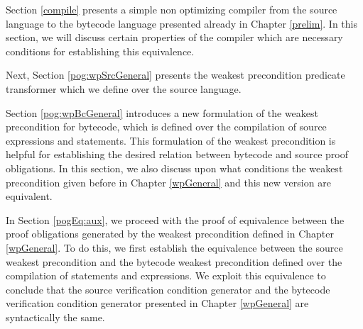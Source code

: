 Section \ref{compile} presents a simple non optimizing compiler from the source language to the bytecode
 language presented already in Chapter \ref{prelim}. In this section, we will discuss certain properties of the 
compiler which are necessary conditions for establishing this equivalence.

Next, Section \ref{pog:wpSrcGeneral} presents the weakest precondition predicate 
transformer which we define over the source language.

Section  \ref{pog:wpBcGeneral} introduces a new formulation of the weakest precondition for bytecode, which 
is defined over the  compilation of source expressions and statements. This formulation of the weakest precondition
 is helpful for establishing the desired 
relation between bytecode and source proof obligations.
 In this section, we also discuss upon what conditions
the weakest precondition given before in Chapter \ref{wpGeneral} and 
this new version are equivalent.

In Section \ref{pogEq:aux}, we proceed with the proof of equivalence between the proof obligations generated 
by the weakest precondition defined in  Chapter \ref{wpGeneral}.
To do this, we first establish  the equivalence between the source weakest precondition and the bytecode weakest precondition
 defined over the compilation of statements and expressions. We exploit this equivalence 
to conclude that the source verification condition generator and the bytecode verification condition generator 
presented in Chapter \ref{wpGeneral} are syntactically the same.
 








